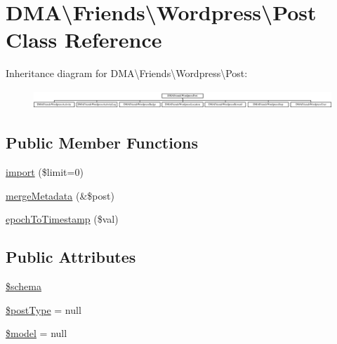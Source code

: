 \hypertarget{classDMA_1_1Friends_1_1Wordpress_1_1Post}{\section{D\+M\+A\textbackslash{}Friends\textbackslash{}Wordpress\textbackslash{}Post Class Reference}
\label{classDMA_1_1Friends_1_1Wordpress_1_1Post}
}
Inheritance diagram for D\+M\+A\textbackslash{}Friends\textbackslash{}Wordpress\textbackslash{}Post\+:\begin{figure}[H]
\begin{center}
\leavevmode
\includegraphics[height=0.701754cm]{d2/de2/classDMA_1_1Friends_1_1Wordpress_1_1Post}
\end{center}
\end{figure}
\subsection*{Public Member Functions}
\begin{DoxyCompactItemize}
\item 
\hyperlink{classDMA_1_1Friends_1_1Wordpress_1_1Post_a4eb2c6b3e89a43b3221e9e2564059510}{import} (\$limit=0)
\item 
\hyperlink{classDMA_1_1Friends_1_1Wordpress_1_1Post_adb1c6652d06b360d1f81d14dde95b5b1}{merge\+Metadata} (\&\$post)
\item 
\hyperlink{classDMA_1_1Friends_1_1Wordpress_1_1Post_af6960d9c63c4224f6f481c88d2b5d076}{epoch\+To\+Timestamp} (\$val)
\end{DoxyCompactItemize}
\subsection*{Public Attributes}
\begin{DoxyCompactItemize}
\item 
\hyperlink{classDMA_1_1Friends_1_1Wordpress_1_1Post_a38fc35f2a6a04046e386cfd3f3564d89}{\$schema}
\item 
\hyperlink{classDMA_1_1Friends_1_1Wordpress_1_1Post_a9b0ea251e8ba6b7161fc51ffa8fb72d8}{\$post\+Type} = null
\item 
\hyperlink{classDMA_1_1Friends_1_1Wordpress_1_1Post_a8a3df2e9db7f90d348d27ea9354176b1}{\$model} = null
\end{DoxyCompactItemize}
